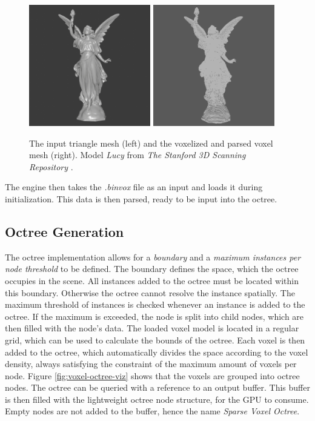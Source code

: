 \begin{figure}[h]
    \centering
    \includegraphics[width=200px]{images/graphics/lucy-triangle-mesh.png}
    \includegraphics[width=200px]{images/graphics/lucy-voxel-mesh.png}
    \caption{The input triangle mesh (left) and the voxelized and parsed voxel mesh (right). 
    Model \emph{Lucy} from \emph{The Stanford 3D Scanning Repository} \cite{Stanford23}.}
    \label{fig:trimesh-to-voxel-mesh}
\end{figure}

\noindent
The engine then takes the \emph{.binvox} file as an input and loads it during initialization. This data is then
parsed, ready to be input into the octree.


\subsection*{Octree Generation}

The octree implementation allows for a \emph{boundary} and a \emph{maximum instances per node threshold} to be defined. 
The boundary defines the space, which the octree occupies in the scene. All instances added to the octree must 
be located within this boundary. Otherwise the octree cannot resolve the instance spatially. The maximum threshold 
of instances is checked whenever an instance is added to the octree. If the maximum is exceeded, the node is split into 
child nodes, which are then filled with the node's data. The loaded voxel model is located in a regular 
grid, which can be used to calculate the bounds of the octree. Each voxel is then added to the octree, which 
automatically divides the space according to the voxel density, always satisfying the constraint of the maximum 
amount of voxels per node. Figure \ref{fig:voxel-octree-viz} shows that the voxels are grouped into octree nodes. 
The octree can be queried with a reference to an output buffer. This buffer is then filled with the lightweight octree 
node structure, for the \ac{GPU} to consume. Empty nodes are not added to the buffer, hence the name \emph{Sparse 
Voxel Octree}. 


